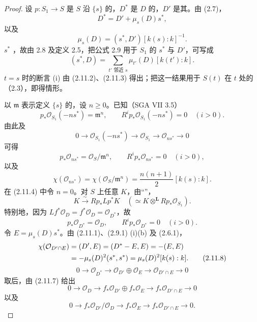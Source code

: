 \begin{proof}
设 $p:S_1\to S$ 是 $S$ 沿 $\{s\}$ 的，$D^*$ 是 $D$ 的，$D'$ 是其。由 (2.7)，
\[
D^*=D'+\mu_s(D)s^*,\tag{2.11.1}
\]
以及
\[
\mu_s(D)=(s^*,D')[k(s):k]^{-1}.\tag{2.11.2}
\]
 $s^*$ ，故由 2.8 及定义 2.5，把公式 2.9 用于 $S_1$ 的 $s^*$ 与 $D'$，可写成
\[
(s^*,D)=\sum_{t'\text{ 邻近 }s}\mu_{t'}(D)[k(t'):k].\tag{2.11.3}
\]
$t=s$ 时的断言 (i) 由 (2.11.2)、(2.11.3) 得出；把这一结果用于 $S(t)$ 在 $t$ 处的（2.3），即得情形。

以 $\mathfrak m$ 表示定义 $\{s\}$ 的，设 $n\geq0$。已知（SGA VII 3.5）
\[
p_*\mathcal O_{S_1}(-ns^*)=\mathfrak m^n,\qquad
R^ip_*\mathcal O_{S_1}(-ns^*)=0\quad(i>0).\tag{2.11.4}
\]
由此及
\[
0\longrightarrow\mathcal O_{S_1}(-ns^*)\longrightarrow\mathcal O_{S_1}
\longrightarrow\mathcal O_{ns^*}\longrightarrow0
\]
可得
\[
p_*\mathcal O_{ns^*}=\mathcal O_S/\mathfrak m^n,\qquad
R^ip_*\mathcal O_{ns^*}=0\quad(i>0),\tag{2.11.5}
\]
以及
\[
\chi(\mathcal O_{ns^*})=\chi(\mathcal O_S/\mathfrak m^n)
=\frac{n(n+1)}2[k(s):k].\tag{2.11.6}
\]
在 (2.11.4) 中令 $n=0$。对 $S$ 上任意 $K$，由“”，
\[
K\xrightarrow{\sim}Rp_*Lp^*K
\quad(\simeq K\mathbin{\otimes^{\mathbf L}}Rp_*\mathcal O_{S_1}).
\]
特别地，因为 $Lf^*\mathcal O_D=f^*\mathcal O_D=\mathcal O_{D^*}$，故
\[
p_*\mathcal O_{D^*}=\mathcal O_D,\qquad R^ip_*\mathcal O_{D^*}=0\quad(i>0).\tag{2.11.7}
\]
令 $E=\mu_s(D)s^*$。由 (2.11.1)、(2.9.1) (i)(b) 及 (2.6.1)，
\begin{align}
\chi(\mathcal O_{D'\cap E})&=(D',E)=(D^*-E,E)=-(E,E)\notag\\
&=-\mu_s(D)^2(s^*,s^*)=\mu_s(D)^2[k(s):k].\tag{2.11.8}
\end{align}
\[
0\longrightarrow\mathcal O_{D^*}\longrightarrow
\mathcal O_{D'}\oplus\mathcal O_E\longrightarrow\mathcal O_{D'\cap E}\longrightarrow0
\]
取后，由 (2.11.7) 给出
\[
0\longrightarrow\mathcal O_D\longrightarrow f_*\mathcal O_{D'}\oplus f_*\mathcal O_E
\longrightarrow f_*\mathcal O_{D'\cap E}\longrightarrow0
\]
以及
\[
0\longrightarrow f_*\mathcal O_{D'}/\mathcal O_D\longrightarrow f_*\mathcal O_E
\longrightarrow f_*\mathcal O_{D'\cap E}\longrightarrow0.
\]

\end{proof}
